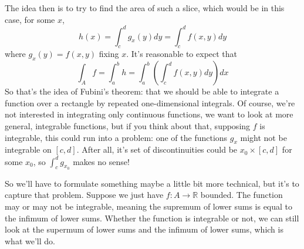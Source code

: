 \documentclass{article}
\newcommand{\reals}[0]{\mathbb{R}}
\begin{document}
The idea then is to try to find the area of such a slice, which would be in this case, for some \(x\),
\begin{equation}
  h(x) = \int_c^dg_x(y)dy = \int_c^df(x, y)dy
\end{equation}
where \(g_x(y) = f(x, y)\) fixing \(x\). It's reasonable to expect that
\begin{equation}
  \int_Af = \int_a^bh = \int_a^b\left(\int_c^df(x, y)dy\right)dx
\end{equation}
So that's the idea of Fubini's theorem: that we should be able to integrate a function over a rectangle by repeated one-dimensional integrals. Of course, we're not interested in integrating only continuous functions, we want to look at more general, integrable functions, but if you think about that, supposing \(f\) is integrable, this could run into a problem: one of the functions \(g_x\) might not be integrable on \([c, d]\). After all, it's set of discontinuities could be \(x_0 \times [c, d]\) for some \(x_0\), so \(\int_c^dg_{x_0}\) makes no sense!

So we'll have to formulate something maybe a little bit more technical, but it's to capture that problem. Suppose we just have \(f: A \to \reals\) bounded. The function may or may not be integrable, meaning the supremum of lower sums is equal to the infimum of lower sums. Whether the function is integrable or not, we can still look at the supermum of lower sums and the infimum of lower sums, which is what we'll do.
\end{document}
